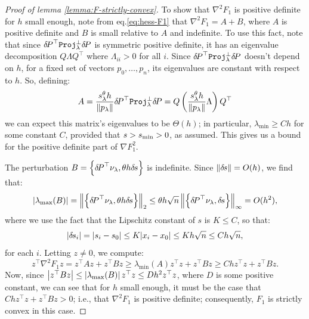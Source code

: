 \documentclass[smallcondensed]{svjour3}
\begin{document}
\begin{proof}[Proof of lemma \ref{lemma:F-strictly-convex}]
  To show that $\nabla^2 F_1$ is positive definite for $h$ small
  enough, note from eq.\@ \ref{eq:hess-F1} that
  $\nabla^2 F_1 = A + B$, where $A$ is positive definite and $B$ is
  small relative to $A$ and indefinite. To use this fact, note that
  since ${\delta \hspace{-0.14em} P}^\top \mathtt{Proj}^\perp_\lambda {\delta \hspace{-0.14em} P}$ is symmetric positive
  definite, it has an eigenvalue decomposition $Q \Lambda Q^\top$
  where $\Lambda_{ii} > 0$ for all $i$. Since
  ${\delta \hspace{-0.14em} P}^\top \mathtt{Proj}^\perp_\lambda {\delta \hspace{-0.14em} P}$ doesn't depend on $h$, for a
  fixed set of vectors $p_0, \hdots, p_n$, its eigenvalues are
  constant with respect to $h$. So, defining:
  \begin{equation}
    A = \frac{s^\theta_\lambda h}{\|p_\lambda\|} {\delta \hspace{-0.14em} P}^\top \mathtt{Proj}^\perp_\lambda {\delta \hspace{-0.14em} P} = Q \left(\frac{s^\theta_\lambda h}{\|p_\lambda\|} \Lambda\right) Q^\top
  \end{equation}
  we can expect this matrix's eigenvalues to be $\Theta(h)$; in
  particular, $\lambda_{\min} \geq C h$ for some constant $C$,
  provided that $s > s_{\operatorname{min}} > 0$, as assumed. This gives us a bound for
  the positive definite part of $\nabla F_1^2$.

  The perturbation $B = \left\{{\delta \hspace{-0.14em} P}^\top \nu_\lambda, \theta h {\delta \hspace{-0.1em} s}\right\}$
  is indefinite. Since $\left\|{\delta \hspace{-0.1em} s}\right\| = O(h)$, we find that:
  \begin{equation}
    |\lambda_{\max}(B)| = \left\|\left\{{\delta \hspace{-0.14em} P}^\top \nu_\lambda,
        \theta h {\delta \hspace{-0.1em} s}\right\}\right\|_2 \leq \theta h \sqrt{n} \left\|\left\{{\delta \hspace{-0.14em} P}^\top \nu_\lambda, {\delta \hspace{-0.1em} s}\right\}\right\|_\infty = O(h^2),
  \end{equation}
  where we use the fact that the Lipschitz constant of $s$ is
  $K \leq C$, so that:
  \begin{equation}
    |{\delta \hspace{-0.1em} s}_i| = |s_i - s_0| \leq K |x_i - x_0| \leq K h \sqrt{n}
    \leq Ch \sqrt{n},
  \end{equation}
  for each $i$. Letting $z \neq 0$, we compute:
  \begin{equation}
    z^\top \nabla^2 F_1 z = z^\top A z + z^\top B z \geq \lambda_{\min}(A) z^\top z + z^\top B z \geq Ch z^\top z + z^\top B z.
  \end{equation}
  Now, since
  $\left|z^\top B z\right| \leq \left|\lambda_{\max}(B)\right| z^\top z \leq D h^2
  z^\top z$, where $D$ is some positive constant, we can see that for
  $h$ small enough, it must be the case that
  $Ch z^\top z + z^\top B z > 0$; i.e., that $\nabla^2 F_1$ is
  positive definite; consequently, $F_1$ is strictly convex in this case.
\end{proof}
\end{document}
